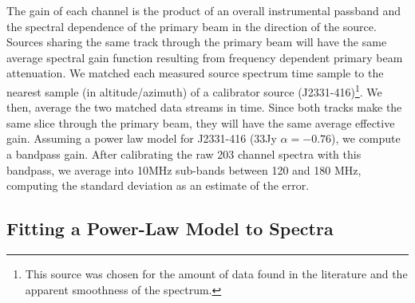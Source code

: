 \documentclass[preprint]{aastex}
\begin{document}

The gain of each channel is the product of an overall instrumental passband and
the spectral dependence of the primary beam in the direction of the source.
Sources sharing the same track through the primary beam will have the same
average spectral gain function resulting from frequency dependent primary beam
attenuation.   We matched each measured source spectrum time sample to the
nearest sample (in altitude/azimuth) of a calibrator source
(J2331-416)\footnote{This source was chosen for the amount of data found in the
literature and the apparent smoothness of the spectrum.}.  We then, average the
two matched data streams in time.  Since both tracks make the same slice
through the primary beam, they will have the same average effective gain.
Assuming a power law model for J2331-416 (33Jy $\alpha=-0.76$), we compute a
bandpass gain.  After calibrating the raw 203 channel spectra with this
bandpass, we average into 10MHz sub-bands between 120 and 180 MHz, computing
the standard deviation as an estimate of the error. 



\subsection{Fitting a Power-Law Model to Spectra}

\end{document}
